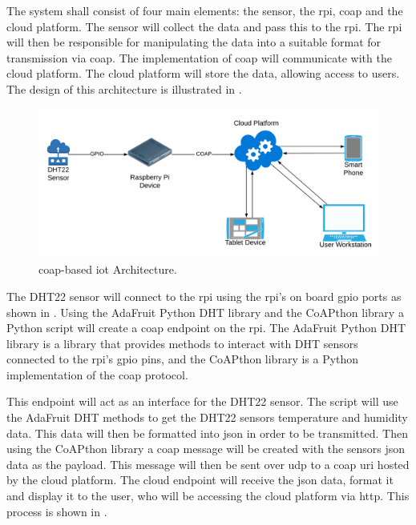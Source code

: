The system shall consist of four main elements: the sensor, the \gls{rpi}, \gls{coap} and the cloud platform.
The sensor will collect the data and pass this to the \gls{rpi}. The \gls{rpi} will then be responsible for manipulating
the data into a suitable format for transmission via \gls{coap}. The implementation of \gls{coap} will communicate with
the cloud platform. The cloud platform will store the data, allowing access to users.
The design of this architecture is illustrated in .

\begin{figure}[H]
    \centering
    \includegraphics[width=\imageWidth\textwidth]{assets/Project_Framework.png}
    \caption{\label{fig:coap_iot_architecture} \gls{coap}-based \gls{iot} Architecture.}
\end{figure}


The DHT22 sensor will connect to the \gls{rpi} using the \gls{rpi}'s on board 
\gls{gpio} ports as shown in . 
Using the AdaFruit Python DHT library and the CoAPthon library a Python script 
will create a \gls{coap} endpoint on the \gls{rpi}.
The AdaFruit Python DHT library is a library that provides methods to interact 
with DHT sensors connected to the \gls{rpi}'s \gls{gpio} pins, 
and the CoAPthon library is a Python implementation of the \gls{coap} protocol.


This endpoint will act as an interface for the DHT22 sensor. 
The script will use the AdaFruit DHT methods to get the DHT22 sensors temperature 
and humidity data. This data will then be formatted into \gls{json} in order to 
be transmitted. Then using the CoAPthon library a \gls{coap} message will be created 
with the sensors \gls{json} data as the payload. This message will then be sent over
\gls{udp} to a \gls{coap} \gls{uri} hosted by the cloud platform. The cloud endpoint 
will receive the \gls{json} data, format it and display it to the user, who will 
be accessing the cloud platform via \gls{http}. This process is shown in .

